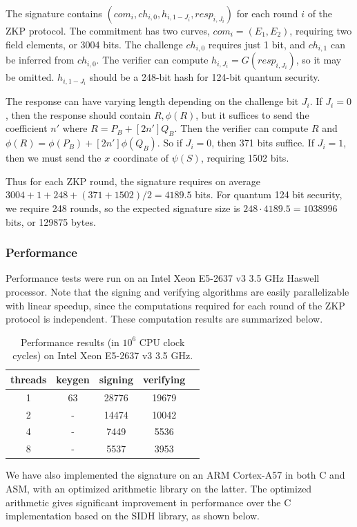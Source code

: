 \documentclass[runningheads,a4paper]{llncs}
\begin{document}
The signature contains $(com_i, ch_{i,0}, h_{i,1-J_i}, resp_{i,J_i})$ for each round $i$ of the ZKP protocol. The commitment has two curves, $com_i=(E_1,E_2)$, requiring two field elements, or 3004 bits. The challenge $ch_{i,0}$ requires just 1 bit, and $ch_{i,1}$ can be inferred from $ch_{i,0}$. The verifier can compute $h_{i,J_i} = G(resp_{i,J_i})$, so it may be omitted. $h_{i,1-J_i}$ should be a 248-bit hash for 124-bit quantum security. 

The response can have varying length depending on the challenge bit $J_i$. If $J_i = 0$, then the response should contain $R,\phi(R)$, but it suffices to send the coefficient $n'$ where $R = P_B + [2n']Q_B$. Then the verifier can compute $R$ and $\phi(R) = \phi(P_B)+[2n']\phi(Q_B)$. So if $J_i=0$, then 371 bits suffice. If $J_i=1$, then we must send the $x$ coordinate of $\psi(S)$, requiring 1502 bits.

Thus for each ZKP round, the signature requires on average $3004 + 1 + 248 + (371+1502)/2 = 4189.5$ bits. For quantum 124 bit security, we require 248 rounds, so the expected signature size is $248 \cdot 4189.5 = 1038996$ bits, or 129875 bytes.


\subsubsection{Performance}
Performance tests were run on an Intel Xeon E5-2637 v3 3.5 GHz Haswell processor. Note that the signing and verifying algorithms are easily parallelizable with linear speedup, since the computations required for each round of the ZKP protocol is independent. These computation results are summarized below.  

\begin{table}[ht]
\centering
\begin{tabular}{c | c c c c}
threads	&	keygen 	& 	signing   	& verifying \\ \hline
1		&	63	     	& 	28776   	& 19679     \\ 
2		&	-		&	14474	& 10042	\\
4		&	-		&	7449		& 5536	\\
8		&	-		&	5537		& 3953	
\end{tabular}
\caption{Performance results (in $10^6$ CPU clock cycles) on Intel Xeon E5-2637 v3 3.5 GHz.}
\end{table}

We have also implemented the signature on an ARM Cortex-A57 in both C and ASM, with an optimized arithmetic library on the latter. The optimized arithmetic gives significant improvement in performance over the C implementation based on the SIDH library, as shown below.
\end{document}
